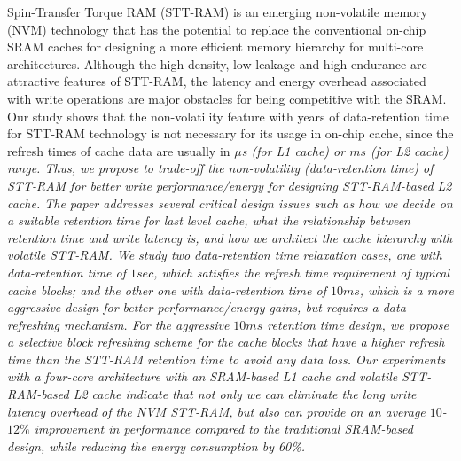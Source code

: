 
Spin-Transfer Torque RAM (STT-RAM) is an emerging non-volatile memory (NVM)
technology that has the potential to replace the conventional
on-chip SRAM caches for designing a more efficient memory hierarchy for
multi-core architectures. Although the high density, low leakage and high endurance are attractive features of STT-RAM,
the latency and energy overhead associated with write operations are major obstacles for being competitive with the SRAM.
Our study shows that the non-volatility feature with years of data-retention time for STT-RAM technology is not necessary for its usage in on-chip cache, since the refresh times of cache data are usually in  \it{$\mu$s} (for L1 cache) or $ms$ (for L2 cache) range. 
Thus,  we propose to trade-off the non-volatility (data-retention time) of STT-RAM
for better write performance/energy for designing STT-RAM-based L2 cache.
The paper addresses several critical design issues such as how we decide on a suitable retention time for last level cache,
what the relationship between retention time and write latency is,
and how we architect the cache hierarchy with volatile STT-RAM.
We study two
data-retention time relaxation cases, one with data-retention time of  $1sec$, which satisfies the refresh time requirement of typical cache blocks; and the other one with data-retention time of $10ms$, which is a more aggressive design for better performance/energy gains, but requires a data refreshing mechanism.
For the aggressive $10ms$ retention time design, we propose a selective block refreshing scheme for the
cache blocks that have a higher refresh time than the STT-RAM retention time to avoid any data loss.
Our experiments with a four-core architecture with an SRAM-based L1 cache and volatile STT-RAM-based L2 cache
indicate that not only we can eliminate the long write latency overhead of the NVM STT-RAM, but also can provide
on an average $10$-$12\%$ improvement in performance compared to the traditional SRAM-based
design, while reducing the energy consumption by 60\%.

